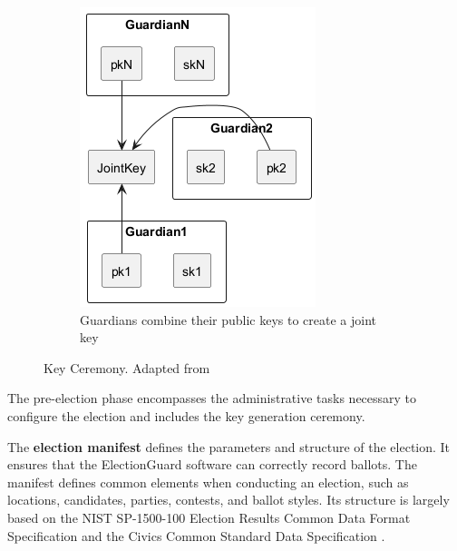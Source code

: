 \begin{figure}[h!]
\begin{subfigure}{0.3\textwidth}
        \centering
        \includegraphics[width=\textwidth]{abbildungen/Diagramme/keyceremony3.png}
        \caption{Guardians combine their public keys to create a joint key}
        \label{fig:jointkey}
    \end{subfigure}
    \caption{Key Ceremony. Adapted from \cite{eg-docs}}
    \label{fig:keyceremony}
\end{figure}

The pre-election phase encompasses the administrative tasks necessary to configure the election and includes the key generation ceremony. 

The \textbf{election manifest} defines the parameters and structure of the election. It ensures that the ElectionGuard software can correctly record ballots. The manifest defines common elements when conducting an election, such as locations, candidates, parties, contests, and ballot styles.  Its structure is largely based on the NIST SP-1500-100 Election Results Common Data Format Specification and the Civics Common Standard Data Specification \cite{eg-docs}. 

